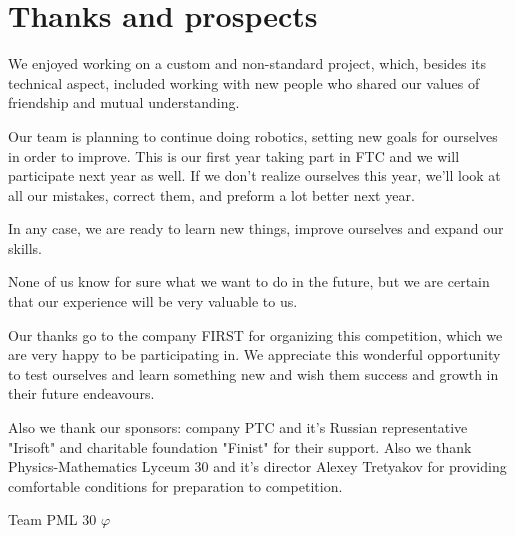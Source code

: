 
\section{Thanks and prospects} 
We enjoyed working on a custom and non-standard project, which, besides its technical aspect, included working with new people who shared our values of friendship and mutual understanding. 

Our team is planning to continue doing robotics, setting new goals for ourselves in order to improve. This is our first year taking part in FTC and we will participate next year as well. If we don't realize ourselves this year, we'll look at all our mistakes, correct them, and preform a lot better next year.

In any case, we are ready to learn new things, improve ourselves and expand our skills. 

None of us know for sure what we want to do in the future, but we are certain that our experience will be very valuable to us. 

Our thanks go to the company FIRST for organizing this competition, which we are very happy to be participating in. We appreciate this wonderful opportunity to test ourselves and learn something new and wish them success and growth in their future endeavours.

Also we thank our sponsors: company PTC and it's Russian representative "Irisoft" and charitable foundation "Finist" for their support. Also we thank Physics-Mathematics Lyceum 30 and it's director Alexey Tretyakov for providing comfortable conditions for preparation to competition.


\begin{center}
	Team PML 30 ${\varphi}$
\end{center}

\vspace{0.5em}

\begin{figure}[H]
	\begin{minipage}[h]{0.47\linewidth}
	\end{minipage}
	\hfill
	\begin{minipage}[h]{0.47\linewidth}
	\end{minipage}
\end{figure}


